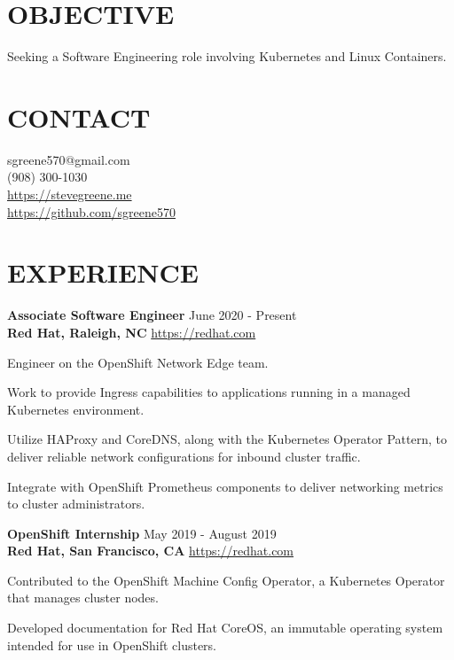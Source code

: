 \documentclass[line, margin, 11pt]{res}
\begin{document}

\begin{resume}

\section{\small OBJECTIVE}
Seeking a Software Engineering role involving Kubernetes and Linux Containers.

\section{\small CONTACT}
sgreene570@gmail.com \\
(908) 300-1030 \\
\url{https://stevegreene.me} \\
\url{https://github.com/sgreene570}

\section{\small EXPERIENCE}
{\bf \large{Associate Software Engineer}} \hfill June 2020 - Present \\
{\bf Red Hat, Raleigh, NC} \hfill \url{https://redhat.com}
\begin{compactitem}
    \item Engineer on the OpenShift Network Edge team.
    \item Work to provide Ingress capabilities to applications running in a managed Kubernetes environment.
    \item Utilize HAProxy and CoreDNS, along with the Kubernetes Operator Pattern, to deliver reliable network configurations for inbound cluster traffic.
    \item Integrate with OpenShift Prometheus components to deliver networking metrics to cluster administrators.
\end{compactitem}


{\bf \large{OpenShift Internship}} \hfill May 2019 - August 2019 \\
{\bf Red Hat, San Francisco, CA} \hfill \url{https://redhat.com}
\begin{compactitem}
    \item Contributed to the OpenShift Machine Config Operator, a Kubernetes Operator that manages cluster nodes.
    \item Developed documentation for Red Hat CoreOS, an immutable operating system intended for use in OpenShift clusters.
\end{compactitem}



\end{resume}
\end{document}
